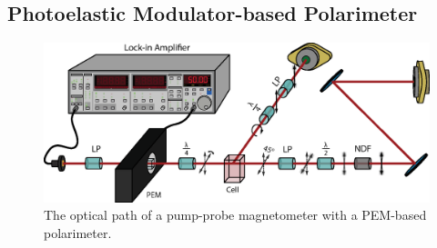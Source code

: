 \documentclass[PaulGanssle-Thesis.tex]{subfiles}
\begin{document}
\subsection{Photoelastic Modulator-based Polarimeter}
\label{mag.design.pem}

\begin{figure}[ht!]
\centering
\includegraphics[width=0.9\tw]{figures/magnetometer/PEMSetup.eps}
\caption{The optical path of a pump-probe magnetometer with a PEM-based polarimeter.}
\label{fig:PEMOpticalPath}
\end{figure}
\end{document}
